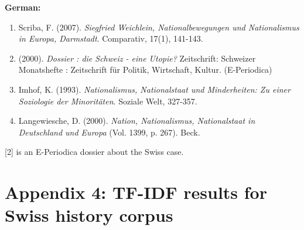 \documentclass[11pt]{article}
\begin{document}
\noindent\textbf{German: }

\begin{enumerate}
    \item Scriba, F. (2007). \textit{Siegfried Weichlein, Nationalbewegungen und Nationalismus in Europa, Darmstadt}. Comparativ, 17(1), 141-143.
    \item (2000). \textit{Dossier : die Schweiz - eine Utopie?} Zeitschrift: Schweizer Monatshefte : Zeitschrift für Politik, Wirtschaft, Kultur. (E-Periodica)
    \item Imhof, K. (1993). \textit{Nationalismus, Nationalstaat und Minderheiten: Zu einer Soziologie der Minoritäten}. Soziale Welt, 327-357.
    \item Langewiesche, D. (2000). \textit{Nation, Nationalismus, Nationalstaat in Deutschland und Europa} (Vol. 1399, p. 267). Beck.
\end{enumerate}

[2] is an E-Periodica dossier about the Swiss case.

\section*{Appendix 4: TF-IDF results for Swiss history corpus}
\label{appendix4}
\end{document}
